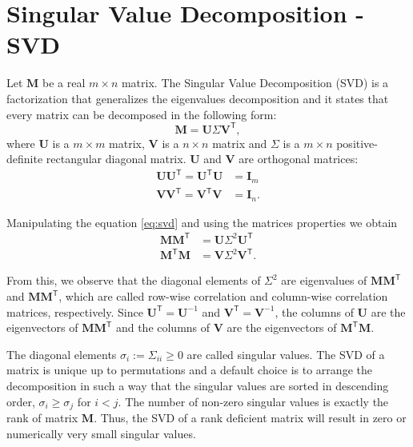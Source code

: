 \appendix

\chapter{Singular Value Decomposition - SVD}\label{appendix:svd}

Let $\mathbf{M}$ be a real $m \times n$ matrix. The Singular Value Decomposition (SVD) is a factorization that generalizes the eigenvalues decomposition and it states that every matrix can be decomposed in the following form:
\begin{equation}
    \mathbf{M} = \mathbf{U} \Sigma \mathbf{V}^{\mathsf{T}},
    \label{eq:svd}
\end{equation}
where $\mathbf{U}$ is a $m \times m$ matrix, $\mathbf{V}$ is a $n \times n$ matrix and $\Sigma$ is a $m \times n$ positive-definite rectangular diagonal matrix. $\mathbf{U}$ and $\mathbf{V}$ are orthogonal matrices:
\begin{align}
    \mathbf{U}\mathbf{U}^{\mathsf{T}} = \mathbf{U}^{\mathsf{T}}\mathbf{U} &= \mathbf{I}_{m} \\
    \mathbf{V}\mathbf{V}^{\mathsf{T}} = \mathbf{V}^{\mathsf{T}}\mathbf{V} &= \mathbf{I}_{n}. 
\end{align}

Manipulating the equation \eqref{eq:svd} and using the matrices properties we obtain
\begin{align}
    \mathbf{M}\mathbf{M}^{\mathsf{T}} &= \mathbf{U} \Sigma^2 \mathbf{U}^{\mathsf{T}} \\
    \mathbf{M}^{\mathsf{T}}\mathbf{M} &=  \mathbf{V} \Sigma^2 \mathbf{V}^{\mathsf{T}}.
\end{align}

From this, we observe that the diagonal elements of $\Sigma^2$ are eigenvalues of $\mathbf{M}\mathbf{M}^{\mathsf{T}}$ and $\mathbf{M}\mathbf{M}^{\mathsf{T}}$, which are called row-wise correlation and column-wise correlation matrices, respectively. Since $\mathbf{U}^{\mathsf{T}} = \mathbf{U}^{-1}$ and $\mathbf{V}^{\mathsf{T}} = \mathbf{V}^{-1}$, the columns of $\mathbf{U}$ are the eigenvectors of $\mathbf{M}\mathbf{M}^{\mathsf{T}}$ and the columns of $\mathbf{V}$ are the eigenvectors of $\mathbf{M}^{\mathsf{T}}\mathbf{M}$.

The diagonal elements $\sigma_i := \Sigma_{ii} \geq 0$ are called singular values. The SVD of a matrix is unique up to permutations and a default choice is to arrange the decomposition in such a way that the singular values are sorted in descending order, $\sigma_i \geq \sigma_j$ for $i < j$. The number of non-zero singular values is exactly the rank of matrix $\mathbf{M}$. Thus, the SVD of a rank deficient matrix will result in zero or numerically very small singular values. 

